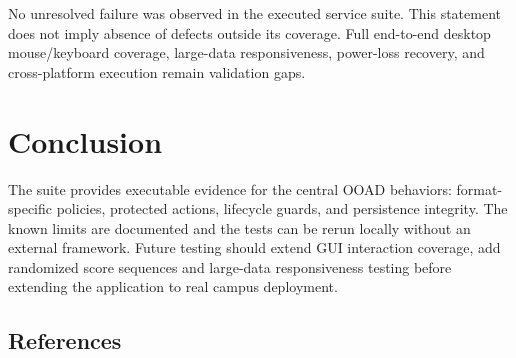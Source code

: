 \documentclass[12pt]{article}
\begin{document}
No unresolved failure was observed in the executed service suite. This statement does not imply absence of defects outside its coverage. Full end-to-end desktop mouse/keyboard coverage, large-data responsiveness, power-loss recovery, and cross-platform execution remain validation gaps.

\clearpage\section{Conclusion}
The suite provides executable evidence for the central OOAD behaviors: format-specific policies, protected actions, lifecycle guards, and persistence integrity. The known limits are documented and the tests can be rerun locally without an external framework. Future testing should extend GUI interaction coverage, add randomized score sequences and large-data responsiveness testing before extending the application to real campus deployment.
\subsection*{References}

\end{document}
